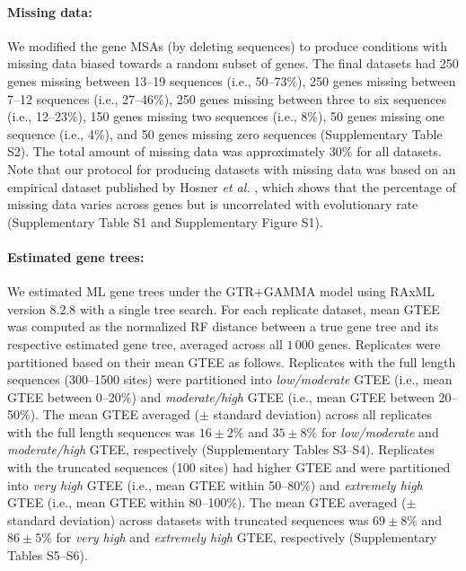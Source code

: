 \paragraph{Missing data:} We modified the gene MSAs (by deleting sequences) to produce conditions with missing data biased towards a random subset of genes.
The final datasets had 250 genes missing between 13--19 sequences (i.e., 50--73\%), 250 genes missing between 7--12 sequences (i.e., 27--46\%), 250 genes missing between three to six sequences (i.e., 12--23\%), 150 genes missing two sequences (i.e., 8\%), 50 genes missing one sequence (i.e., 4\%), and 50 genes missing zero sequences (Supplementary Table S2). 
The total amount of missing data was approximately 30\% for all datasets.
Note that our protocol for producing datasets with missing data was based on an empirical dataset published by Hosner {\em et al.} \cite{hosner2016empirical}, which shows that the percentage of missing data varies across genes but is uncorrelated with evolutionary rate (Supplementary Table S1 and Supplementary Figure S1).

\paragraph{Estimated gene trees:}
We estimated \gls{ML} gene trees under the GTR+GAMMA model using RAxML version 8.2.8 with a single tree search. 
For each replicate dataset, mean GTEE was computed as the normalized \gls{RF} distance between a true gene tree and its respective estimated gene tree, averaged across all $1\,000$ genes. 
Replicates were partitioned based on their mean GTEE as follows. 
Replicates with the full length sequences (300--1500 sites) were partitioned into {\em low/moderate} GTEE (i.e., mean GTEE between 0--20\%) and {\em moderate/high} GTEE (i.e., mean GTEE between 20--50\%). 
The mean GTEE averaged ($\pm$ standard deviation) across all replicates with the full length sequences was $16 \pm 2\%$ and $35 \pm 8\%$ for {\em low/moderate} and {\em moderate/high} GTEE, respectively (Supplementary Tables S3--S4). 
Replicates with the truncated sequences (100 sites) had higher GTEE and were partitioned into {\em very high} GTEE (i.e., mean GTEE within 50--80\%) and {\em extremely high} GTEE (i.e., mean GTEE within 80--100\%). 
The mean GTEE averaged ($\pm$ standard deviation) across datasets with truncated sequences was $69 \pm 8\%$ and $86 \pm 5\%$ for {\em very high} and {\em extremely high} GTEE, respectively (Supplementary Tables S5--S6).

